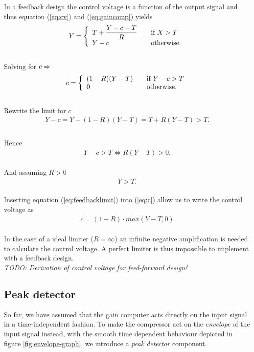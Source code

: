 \documentclass[]{article}
\begin{document}
In a feedback design the control voltage is a function of the output signal and thus equation (\ref{eq:cv}) and (\ref{eq:gaincomp}) yields
\begin{equation}
Y = \left\{ 
  \begin{array}{l l}
    T+ \dfrac{Y-c-T}{R} & \quad \text{if $X > T$}\\
    Y-c & \quad \text{otherwise.}
  \end{array} \right.
\end{equation}
\\Solving for $c \rm \Rightarrow$
\begin{equation} \label{eq:c}
c = \left\{ 
  \begin{array}{l l}
    (1-R)(Y-T)& \quad \text{if $Y-c > T$}\\
    0 & \quad \text{otherwise.}
  \end{array} \right.
\end{equation}
\\Rewrite the limit for $c$
\begin{align*}
Y - c  = Y-(1-R)(Y-T) = T + R(Y-T) > T.   \\
\end{align*}
\\Hence 
\begin{align*}
Y-c > T \Longleftrightarrow R(Y-T)  > 0.
\end{align*}
\\And assuming $R > 0$
\begin{align} \label{eq:feedbacklimit}
Y > T.
\end{align}
\\Inserting equation (\ref{eq:feedbacklimit}) into (\ref{eq:c}) allow us to write the control voltage as
\begin{align}
c = (1-R)\cdot max\left(Y-T,0\right)
\end{align}
\\In the case of a ideal limiter ($R = \infty$) an infinite negative amplification is needed to calculate the control voltage. A perfect limiter is thus impossible to implement with a feedback design.
\\\emph{TODO: Derivation of control voltage for feed-forward design!}

\subsection{Peak detector}
So far, we have assumed that the gain computer acts directly on the input signal in a time-independent fashion. To make the compressor act on the \emph{envelope} of the input signal instead, with the smooth time dependent behaviour depicted in figure \ref{fig:envelope-graph}, we introduce a \emph{peak detector} component.
\end{document}
